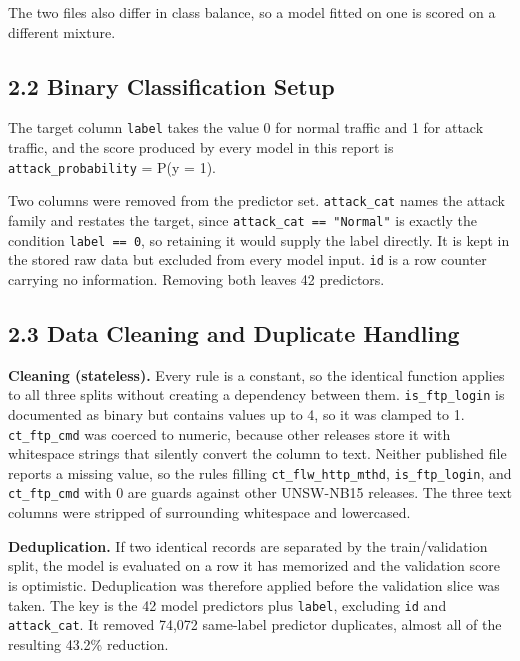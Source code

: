 \documentclass[
  canadian,
  12pt,
]{article}
\let\reportOrigSubsection\subsection
\renewcommand{\subsection}{\par\Needspace*{8\baselineskip}\reportOrigSubsection}%
\begin{document}
The two files also differ in class balance, so a model fitted on one is
scored on a different mixture.

\subsection[\texorpdfstring{\numberline{2.2}Binary Classification Setup}{2.2 Binary Classification Setup}]{2.2 Binary Classification Setup}\label{sec-2-2}

The target column \texttt{label} takes the value 0 for normal traffic
and 1 for attack traffic, and the score produced by every model in this
report is \texttt{attack\_probability} = P(y = 1).

Two columns were removed from the predictor set. \texttt{attack\_cat}
names the attack family and restates the target, since
\texttt{attack\_cat\ ==\ "Normal"} is exactly the condition
\texttt{label\ ==\ 0}, so retaining it would supply the label directly.
It is kept in the stored raw data but excluded from every model input.
\texttt{id} is a row counter carrying no information. Removing both
leaves 42 predictors.

\subsection[\texorpdfstring{\numberline{2.3}Data Cleaning and Duplicate Handling}{2.3 Data Cleaning and Duplicate Handling}]{2.3 Data Cleaning and Duplicate Handling}\label{sec-2-3}

\textbf{Cleaning (stateless).} Every rule is a constant, so the
identical function applies to all three splits without creating a
dependency between them. \texttt{is\_ftp\_login} is documented as binary
but contains values up to 4, so it was clamped to 1.
\texttt{ct\_ftp\_cmd} was coerced to numeric, because other releases
store it with whitespace strings that silently convert the column to
text. Neither published file reports a missing value, so the rules
filling \texttt{ct\_flw\_http\_mthd}, \texttt{is\_ftp\_login}, and
\texttt{ct\_ftp\_cmd} with 0 are guards against other UNSW-NB15
releases. The three text columns were stripped of surrounding whitespace
and lowercased.

\textbf{Deduplication.} If two identical records are separated by the
train/validation split, the model is evaluated on a row it has memorized
and the validation score is optimistic. Deduplication was therefore
applied before the validation slice was taken. The key is the 42 model
predictors plus \texttt{label}, excluding \texttt{id} and
\texttt{attack\_cat}. It removed 74,072 same-label predictor duplicates,
almost all of the resulting 43.2\% reduction.
\end{document}

